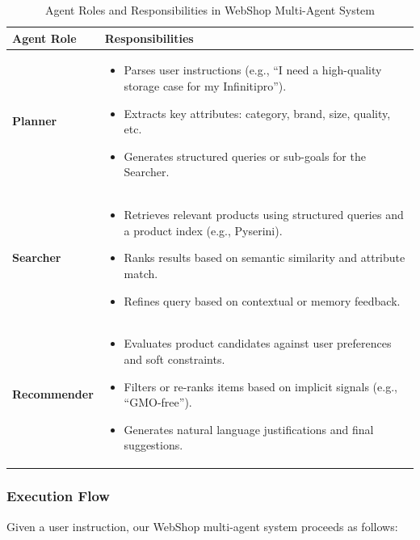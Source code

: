 \begin{table}[t]
\centering
\caption{Agent Roles and Responsibilities in WebShop Multi-Agent System}
\label{tab:webshop_roles}
\begin{tabular}{l|p{10.5cm}}
\toprule
\textbf{Agent Role} & \textbf{Responsibilities} \\
\midrule
\textbf{Planner} & 
\begin{itemize}
    \item Parses user instructions (e.g., ``I need a high-quality storage case for my Infinitipro'').
    \item Extracts key attributes: category, brand, size, quality, etc.
    \item Generates structured queries or sub-goals for the Searcher.
\end{itemize} \\
\hline
\textbf{Searcher} & 
\begin{itemize}
    \item Retrieves relevant products using structured queries and a product index (e.g., Pyserini).
    \item Ranks results based on semantic similarity and attribute match.
    \item Refines query based on contextual or memory feedback.
\end{itemize} \\
\hline
\textbf{Recommender} & 
\begin{itemize}
    \item Evaluates product candidates against user preferences and soft constraints.
    \item Filters or re-ranks items based on implicit signals (e.g., ``GMO-free'').
    \item Generates natural language justifications and final suggestions.
\end{itemize} \\
\bottomrule
\end{tabular}
\end{table}





\subsubsection*{Execution Flow }

Given a user instruction, our WebShop multi-agent system proceeds as follows:

